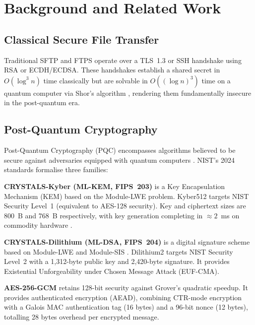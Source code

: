 \section{Background and Related Work}
\label{sec:background}

\subsection{Classical Secure File Transfer}

Traditional SFTP \cite{ylonen2006ssh} and FTPS operate over a
TLS~1.3 \cite{krawczyk2020tls13} or SSH handshake using RSA or
ECDH/ECDSA. These handshakes establish a shared secret in
$O(\log^3 n)$ time classically but are solvable in
$O((\log n)^3)$ time on a quantum computer via Shor's algorithm
\cite{shor1994algorithms}, rendering them fundamentally insecure in
the post-quantum era.

\subsection{Post-Quantum Cryptography}

Post-Quantum Cryptography (PQC) encompasses algorithms believed to
be secure against adversaries equipped with quantum computers
\cite{dam2023survey}. NIST's 2024 standards \cite{nist2024pqc}
formalise three families:

\textbf{CRYSTALS-Kyber (ML-KEM, FIPS~203)} is a Key Encapsulation
Mechanism (KEM) based on the Module-LWE problem. Kyber512 targets
NIST Security Level~1 (equivalent to AES-128 security). Key and
ciphertext sizes are 800~B and 768~B respectively, with key generation
completing in $\approx 2$~ms on commodity hardware
\cite{avanzi2021kyber}.

\textbf{CRYSTALS-Dilithium (ML-DSA, FIPS~204)} is a digital signature
scheme based on Module-LWE and Module-SIS \cite{ducas2018dilithium}.
Dilithium2 targets NIST Security Level~2 with a 1,312-byte public key
and 2,420-byte signature. It provides Existential Unforgeability under
Chosen Message Attack (EUF-CMA).

\textbf{AES-256-GCM} retains 128-bit security against Grover's
quadratic speedup. It provides authenticated encryption (AEAD),
combining CTR-mode encryption with a Galois MAC authentication tag (16
bytes) and a 96-bit nonce (12 bytes), totalling 28 bytes overhead per
encrypted message.

